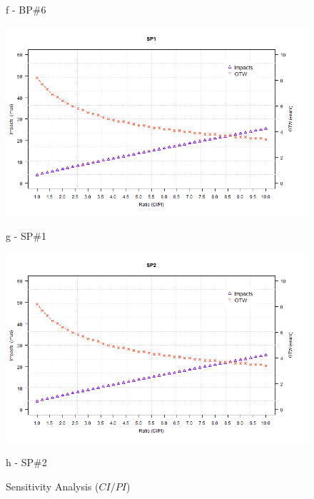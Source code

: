 \begin{figure}[!htb]
\begin{minipage}[b]{0.5\linewidth}
		\caption*{f - BP\#6}
	\end{minipage}
	\hspace{0.05cm}
	\begin{minipage}[b]{0.5\linewidth}
		\centering
		\includegraphics[width=\textwidth]{figures/ch05_fig_sacipi_pump7}
		\caption*{g -  SP\#1}
	\end{minipage}
	\hspace{0.05cm}
	\begin{minipage}[b]{0.5\linewidth}
		\centering
		\includegraphics[width=\textwidth]{figures/ch05_fig_sacipi_pump8}
		\caption*{h - SP\#2}
	\end{minipage}
	\caption{Sensitivity Analysis ($CI/PI$)}
	\label{ch05_fig_sa_cipi}
\end{figure}


